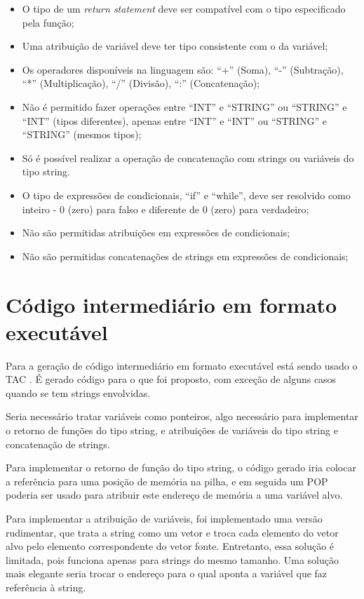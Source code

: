 \documentclass[12pt]{article}
\begin{document}
\begin{itemize}
	\item O tipo de um \textit{return statement} deve ser compatível com o tipo especificado pela função;
	\item Uma atribuição de variável deve ter tipo consistente com o da variável;
	\item Os operadores disponíveis na linguagem são: ``+'' (Soma), ``-'' (Subtração), ``*'' (Multiplicação), ``/'' (Divisão), ``:'' (Concatenação);
	\item Não é permitido fazer operações entre ``INT'' e ``STRING'' ou ``STRING'' e ``INT'' (tipos diferentes), apenas entre ``INT'' e ``INT'' ou ``STRING'' e ``STRING'' (mesmos tipos);
	\item Só é possível realizar a operação de concatenação com strings ou variáveis do tipo string.\\
	\item O tipo de expressões de condicionais, ``if'' e ``while'', deve ser resolvido como inteiro - 0 (zero) para falso e diferente de 0 (zero) para verdadeiro;
	\item Não são permitidas atribuições em expressões de condicionais;
	\item Não são permitidas concatenações de strings em expressões de condicionais;
\end{itemize}

\section{Código intermediário em formato executável}

\indent

Para a geração de código intermediário em formato executável está sendo usado o TAC \cite{tac2014}. É gerado código para o que foi proposto, com exceção de alguns casos quando se tem strings envolvidas.

Seria necessário tratar variáveis como ponteiros, algo necessário para implementar o retorno de funções do tipo string, e atribuições de variáveis do tipo string e concatenação de strings.

Para implementar o retorno de função do tipo string, o código gerado iria colocar a referência para uma posição de memória na pilha, e em seguida um POP poderia ser usado para atribuir este endereço de memória a uma variável alvo.

Para implementar a atribuição de variáveis, foi implementado uma versão rudimentar, que trata a string como um vetor e troca cada elemento do vetor alvo pelo elemento correspondente do vetor fonte. Entretanto, essa solução é limitada, pois funciona apenas para strings do mesmo tamanho. Uma solução mais elegante seria trocar o endereço para o qual aponta a variável que faz referência à string.
\end{document}
